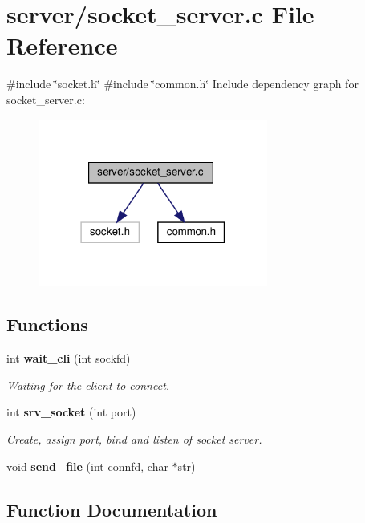 \section{server/socket\+\_\+server.c File Reference}
\label{socket__server_8c}
{\ttfamily \#include \char`\"{}socket.\+h\char`\"{}}\newline
{\ttfamily \#include \char`\"{}common.\+h\char`\"{}}\newline
Include dependency graph for socket\+\_\+server.\+c\+:
\nopagebreak
\begin{figure}[H]
\begin{center}
\leavevmode
\includegraphics[width=214pt]{socket__server_8c__incl}
\end{center}
\end{figure}
\subsection*{Functions}
\begin{DoxyCompactItemize}
\item 
int \textbf{ wait\+\_\+cli} (int sockfd)
\begin{DoxyCompactList}\small\item\em Waiting for the client to connect. \end{DoxyCompactList}\item 
int \textbf{ srv\+\_\+socket} (int port)
\begin{DoxyCompactList}\small\item\em Create, assign port, bind and listen of socket server. \end{DoxyCompactList}\item 
void \textbf{ send\+\_\+file} (int connfd, char $\ast$str)
\end{DoxyCompactItemize}


\subsection{Function Documentation}
\mbox{\label{socket__server_8c_a5f68249c4a06c39600eba28ae2a2f061}} 
